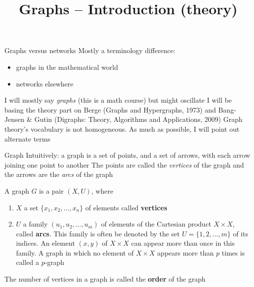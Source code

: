 \documentclass[aspectratio=43]{beamer}
\title{Graphs -- Introduction (theory)}
\date{}
\begin{document}
\begin{frame}
	\titlepage
\end{frame}




\begin{frame}{Graphs versus networks}
Mostly a terminology difference:
\begin{itemize}
\item graphs in the mathematical world
\item networks elsewhere
\end{itemize}
\vfill
I will mostly say \emph{graphs} (this is a math course) but might oscillate
\vfill
I will be basing the theory part on Berge (Graphs and Hypergraphs, 1973) and Bang-Jensen \& Gutin (Digraphs: Theory, Algorithms and Applications, 2009)
\vfill
Graph theory's vocabulary is not homogeneous. As much as possible, I will point out alternate terms
\vfill
\end{frame}


\begin{frame}{Graph}
Intuitively: a graph is a set of points, and a set of arrows, with each arrow joining one point to another
\vfill
The points are called the \emph{vertices} of the graph and the arrows are the \emph{arcs} of the graph
\end{frame}

\begin{frame}
\begin{definition}[Graph]
A graph $G$ is a pair $(X,U)$, where
\begin{enumerate}
\item $X$ a set $\{x_1,x_2,\ldots,x_n\}$ of elements called \textbf{vertices}
\item $U$ a family $(u_1,u_2,\ldots,u_m)$ of elements of the Cartesian product $X\times X$, called \textbf{arcs}. This family is often be denoted by the set $U=\{1,2,\ldots,m\}$ of its indices.
An element $(x,y)$ of $X\times X$ can appear more than once in this family.
A graph in which no element of $X\times X$ appears more than $p$ times is called a $p$-graph
\end{enumerate}
\end{definition}
\vfill
\begin{definition}
The number of vertices in a graph is called the \textbf{order} of the graph
\end{definition}
\end{frame}
\end{document}
